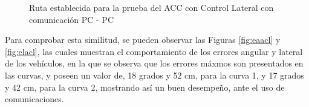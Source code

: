 \begin{figure}[H]
 \centering
 \caption{Ruta establecida para la prueba del ACC con Control Lateral con comunicación PC - PC}
 \label{fig:rutaccl}
\end{figure}

\par Para comprobar esta similitud, se pueden observar las Figuras \ref{fig:eaacl} y \ref{fig:elacl}, las cuales muestran el comportamiento de los errores angular y lateral de los vehículos, en la que se observa que los errores máxmos son presentados en las curvas, y poseen un valor de, 18 grados y 52 cm, para la curva 1, y 17 grados y 42 cm, para la curva 2, mostrando así un buen desempeño, ante el uso de comunicaciones. \\

